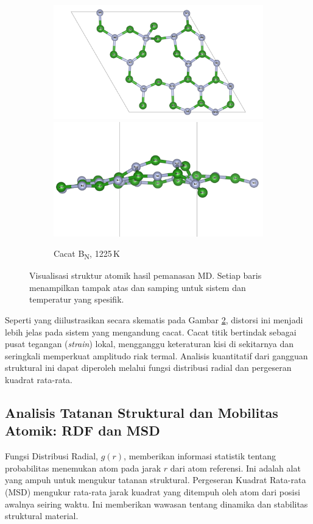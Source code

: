 \begin{figure}[htbp]
\begin{subfigure}{\textwidth}
    \centering
    \includegraphics[width=0.49\linewidth]{gambar_hasil/hBN_BB_1225K.png}\hfill
    \includegraphics[width=0.49\linewidth]{gambar_hasil/hBN_BB_side_1225K.png}
    \caption{Cacat B\textsubscript{N}, 1225 K}
    \label{subfig:md_bb_1225k}
  \end{subfigure}
    \caption{Visualisasi struktur atomik hasil pemanasan MD. Setiap baris menampilkan tampak atas dan samping untuk sistem dan temperatur yang spesifik.}
  \label{fig:md_structures_per_condition}
\end{figure}

Seperti yang diilustrasikan secara skematis pada Gambar \ref{fig:md_structures_per_condition}, distorsi ini menjadi lebih jelas pada sistem yang mengandung cacat.
Cacat titik bertindak sebagai pusat tegangan (\emph{strain}) lokal, mengganggu keteraturan kisi di sekitarnya dan seringkali memperkuat amplitudo riak termal.
Analisis kuantitatif dari gangguan struktural ini dapat diperoleh melalui fungsi distribusi radial dan pergeseran kuadrat rata-rata.

\subsection{Analisis Tatanan Struktural dan Mobilitas Atomik: RDF dan MSD}
\label{subsec:md_rdf_msd}
Fungsi Distribusi Radial, $g(r)$, memberikan informasi statistik tentang probabilitas menemukan atom pada jarak $r$ dari atom referensi.
Ini adalah alat yang ampuh untuk mengukur tatanan struktural. Pergeseran Kuadrat Rata-rata (MSD) mengukur rata-rata jarak kuadrat yang ditempuh oleh atom dari posisi awalnya seiring waktu.
Ini memberikan wawasan tentang dinamika dan stabilitas struktural material.

